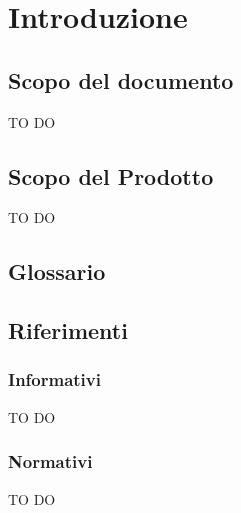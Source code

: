 %


\section{Introduzione}
	\subsection{Scopo del documento}
TO DO	
	\subsection{Scopo del Prodotto}
TO DO	
	\subsection{Glossario}
		\glossarioDesc
	\subsection{Riferimenti}
		\subsubsection{Informativi}
TO DO		
		\subsubsection{Normativi}
TO DO		